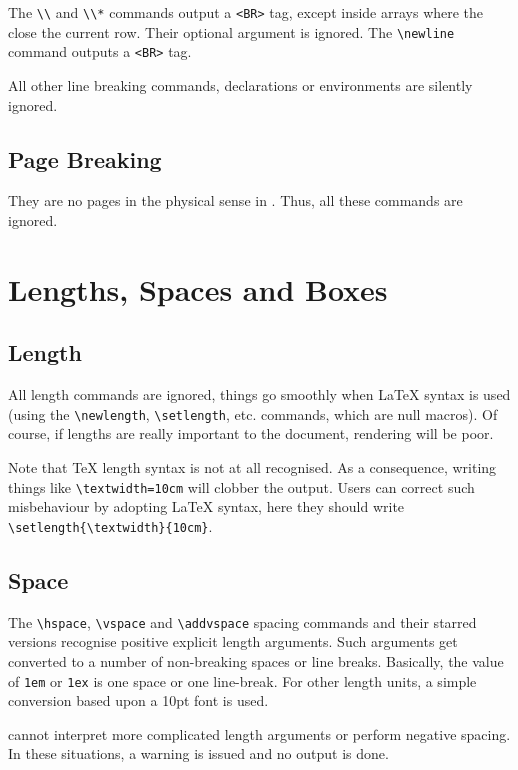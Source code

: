 The \verb+\\+ and \verb+\\*+ commands output a \verb+<BR>+ tag,
except inside arrays where the close the current row.
Their optional argument is ignored.
The \verb+\newline+ command outputs a \verb+<BR>+ tag.

All other line breaking commands, declarations or environments are
silently ignored.

\subsection{Page Breaking}
They are no pages in the physical sense in \html. Thus, all these
commands are ignored.

\section{Lengths, Spaces and Boxes}

\subsection{Length}

All length commands are ignored, things go smoothly when \LaTeX{} syntax is
used (using the \verb+\newlength+, \verb+\setlength+, etc. commands,
which are null macros).
Of course, if lengths are really important to the document, rendering
will be poor.

Note that \TeX{} length syntax is not at all recognised. As a
consequence, writing things like \verb+\textwidth=10cm+ will clobber
the output.
Users can correct such misbehaviour by adopting \LaTeX{} syntax, here
they should write
\verb+\setlength{\textwidth}{10cm}+.


\subsection{Space}
The \verb+\hspace+, \verb+\vspace+ and \verb+\addvspace+ spacing
commands and their starred versions recognise positive explicit length
arguments.  Such arguments get converted to a number of non-breaking
spaces or line breaks.
Basically, the value of \verb+1em+ or \verb+1ex+ is one space or one
line-break. For other length units, a simple conversion based upon a
10pt font is used.


\hevea{} cannot interpret more complicated length arguments
or perform negative spacing.
In these situations, a warning is issued and no output is done.


